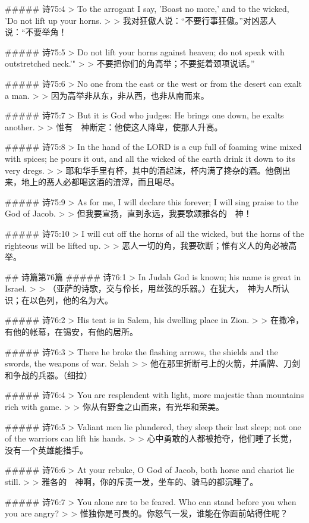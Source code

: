 ##### 诗75:4
> To the arrogant I say, 'Boast no more,' and to the wicked, 'Do not lift up your horns.
>
> 我对狂傲人说：“不要行事狂傲。”对凶恶人说：“不要举角！


##### 诗75:5
> Do not lift your horns against heaven; do not speak with outstretched neck.'"
>
> 不要把你们的角高举；不要挺着颈项说话。”


##### 诗75:6
> No one from the east or the west or from the desert can exalt a man.
>
> 因为高举非从东，非从西，也非从南而来。


##### 诗75:7
> But it is God who judges: He brings one down, he exalts another.
>
> 惟有　神断定：他使这人降卑，使那人升高。


##### 诗75:8
> In the hand of the LORD is a cup full of foaming wine mixed with spices; he pours it out, and all the wicked of the earth drink it down to its very dregs.
>
> 耶和华手里有杯，其中的酒起沫，杯内满了搀杂的酒。他倒出来，地上的恶人必都喝这酒的渣滓，而且喝尽。


##### 诗75:9
> As for me, I will declare this forever; I will sing praise to the God of Jacob.
>
> 但我要宣扬，直到永远，我要歌颂雅各的　神！


##### 诗75:10
> I will cut off the horns of all the wicked, but the horns of the righteous will be lifted up.
>
> 恶人一切的角，我要砍断；惟有义人的角必被高举。


## 诗篇第76篇
##### 诗76:1
> In Judah God is known; his name is great in Israel.
>
> （亚萨的诗歌，交与伶长，用丝弦的乐器。）在犹大，　神为人所认识；在以色列，他的名为大。


##### 诗76:2
> His tent is in Salem, his dwelling place in Zion.
>
> 在撒冷，有他的帐幕，在锡安，有他的居所。


##### 诗76:3
> There he broke the flashing arrows, the shields and the swords, the weapons of war. Selah
>
> 他在那里折断弓上的火箭，并盾牌、刀剑和争战的兵器。（细拉）


##### 诗76:4
> You are resplendent with light, more majestic than mountains rich with game.
>
> 你从有野食之山而来，有光华和荣美。


##### 诗76:5
> Valiant men lie plundered, they sleep their last sleep; not one of the warriors can lift his hands.
>
> 心中勇敢的人都被抢夺，他们睡了长觉，没有一个英雄能措手。


##### 诗76:6
> At your rebuke, O God of Jacob, both horse and chariot lie still.
>
> 雅各的　神啊，你的斥责一发，坐车的、骑马的都沉睡了。


##### 诗76:7
> You alone are to be feared. Who can stand before you when you are angry?
>
> 惟独你是可畏的。你怒气一发，谁能在你面前站得住呢？


